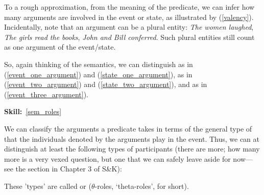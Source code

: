 \documentclass{article}
\begin{document}
To a rough approximation, from the meaning of the predicate, we can infer how many arguments are involved in the event or state, as illustrated by (\ref{valency}).
Incidentally, note that an argument can be a plural entity: \emph{The women laughed}, \emph{The girls read the books}, \emph{John and Bill conferred}.
Such plural entities still count as one argument of the event/state.
\begin{exe}
    \label{valency}
\end{exe}
So, again thinking of the semantics, we can distinguish  as in (\ref{event_one_argument}) and (\ref{state_one_argument}),  as in (\ref{event_two_argument}) and (\ref{state_two_argument}), and  as in (\ref{event_three_argument}).

\hfill{}\textbf{Skill:}~\ref{sem_roles}

We can classify the arguments a predicate takes in terms of the general type of  that the individuals denoted by the arguments play in the event.
Thus, we can at distinguish at least the following types of participants (there are more; how many more is a very vexed question, but one that we can safely leave aside for now---see the section in Chapter 3 of S\&K):
\begin{exe}
\end{exe}
These 'types' are called  or  ($\theta$-roles, `theta-roles', for short).
\end{document}
